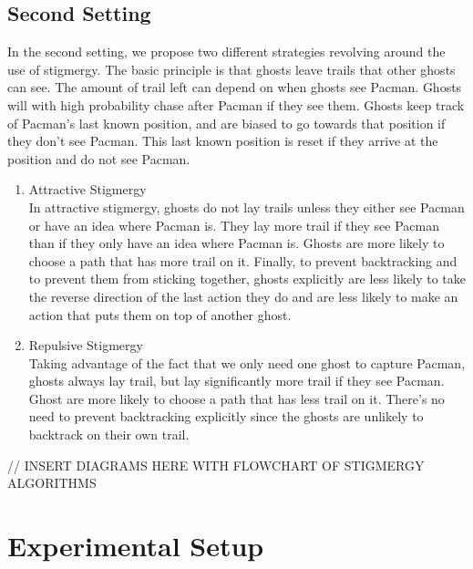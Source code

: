 \documentclass[11pt]{article}
\begin{document}
\begin{multicols}{2}
\subsection{Second Setting}
In the second setting, we propose two different strategies revolving around the use of stigmergy.  The basic principle is that ghosts leave trails that other ghosts can see. The amount of trail left can depend on when ghosts see Pacman.  Ghosts will with high probability chase after Pacman if they see them.  Ghosts keep track of Pacman's last known position, and are biased to go towards that position if they don't see Pacman.  This last known position is reset if they arrive at the position and do not see Pacman.

\begin{enumerate}[leftmargin=0.25cm]
	\item Attractive Stigmergy\\
 	In attractive stigmergy, ghosts do not lay trails unless they either see Pacman or have an idea where Pacman is.  They lay more trail if they see Pacman than if they only have an idea where Pacman is.  Ghosts are more likely to choose a path that has more trail on it.  Finally, to prevent backtracking and to prevent them from sticking together, ghosts explicitly are less likely to take the reverse direction of the last action they do and are less likely to make an action that puts them on top of another ghost.
	
	\item Repulsive Stigmergy\\
	Taking advantage of the fact that we only need one ghost to capture Pacman, ghosts always lay trail, but lay significantly more trail if they see Pacman.  Ghost are more likely to choose a path that has less trail on it.  There's no need to prevent backtracking explicitly since the ghosts are unlikely to backtrack on their own trail.
\end{enumerate}

// INSERT DIAGRAMS HERE WITH FLOWCHART OF STIGMERGY ALGORITHMS


\section{Experimental Setup}

\end{multicols}
\end{document}
